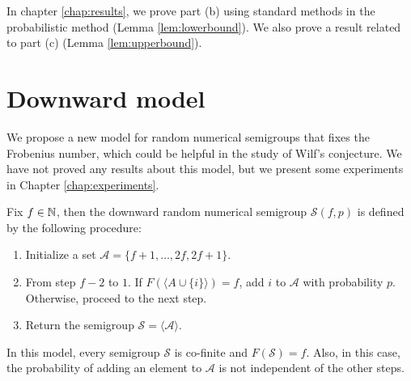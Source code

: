 In chapter \ref{chap:results}, we prove part (b) using standard methods in the probabilistic method (Lemma \ref{lem:lowerbound}). We also prove a result related to part (c) (Lemma \ref{lem:upperbound}).

\section{Downward model}\label{sec:contrib1:theme2}

We propose a new model for random numerical semigroups that fixes the Frobenius number, which could be helpful in the study of Wilf's conjecture. We have not proved any results about this model, but we present some experiments in Chapter \ref{chap:experiments}.

\begin{definition} Fix $f \in \mathbb{N}$, then the downward random numerical semigroup $\mathcal{S}(f, p)$ is defined by the following procedure: 
\begin{enumerate}
    \item Initialize a set $\mathcal{A} = \{f + 1, \ldots, 2f, 2f + 1\}$.
    \item From step $f - 2$ to $1$. If $F(\langle A \cup \{i\} \rangle) = f$, add $i$ to $\mathcal{A}$ with probability $p$. Otherwise, proceed to the next step.
    \item Return the semigroup $\mathcal{S} = \langle\mathcal{A}\rangle$.
\end{enumerate}
In this model, every semigroup $\mathcal{S}$ is co-finite and $F(\mathcal{S}) = f$. Also, in this case, the probability of adding an element to $\mathcal{A}$ is not independent of the other steps. 
    
\end{definition}

